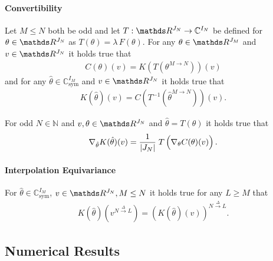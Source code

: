 \paragraph{Convertibility}
\begin{lemma}{\cite[Lem. 3]{kabri2023resolution}}{}
	Let $M \leq N$ both be odd and let $T: \R^{J_N} \rightarrow \mathbb{C}^{I_N}$ be defined for $\theta \in \R^{J_N}$ as
	$T(\theta) = \lambda \, F(\theta)$.
	For any $\theta \in \R^{J_M}$ and $v \in \R^{J_N}$ it holds true that
	\begin{align*}
		C(\theta)(v) = K(T(\theta^{M\rightarrow N}))(v)
	\end{align*}
	and for any $\hat{\theta} \in \mathbb{C}^{I_M}_{\text{sym}}$ and $v \in \R^{J_N}$ it holds true that
	\begin{align*}
		K(\hat{\theta})(v) = C(T^{-1}(\hat{\theta}^{M\rightarrow N}))(v).
	\end{align*}
\end{lemma}

\begin{lemma}{\cite[Lem. 4]{kabri2023resolution}}{}
For odd $N \in \mathbb{N}$ and $v, \theta \in \R^{J_N}$ and $\hat{\theta} = T(\theta)$ it holds true that
\begin{align*}
	\nabla_{\hat{\theta}} K(\hat{\theta})(v) = \frac{1}{|J_N|}\; T \left( \vphantom{\hat{\theta}} \nabla_{\theta}C(\theta)(v) \right). 
\end{align*}
\end{lemma}
%
%
\paragraph{Interpolation Equivariance}
\begin{corollary}
	For $\hat{\theta} \in \mathbb{C}^{I_M}_{\text{sym}}$, $v \in \R^{J_N}, M \leq N$ it holds true for any $L \geq M$ that
	\begin{align*}
		K(\hat{\theta})(v^{N \xrightarrow{\Delta} L}) = \left( K(\hat{\theta})(v) \right)^{N \xrightarrow{\Delta} L}.
	\end{align*}
\end{corollary}


\subsection{Numerical Results}
%
%
